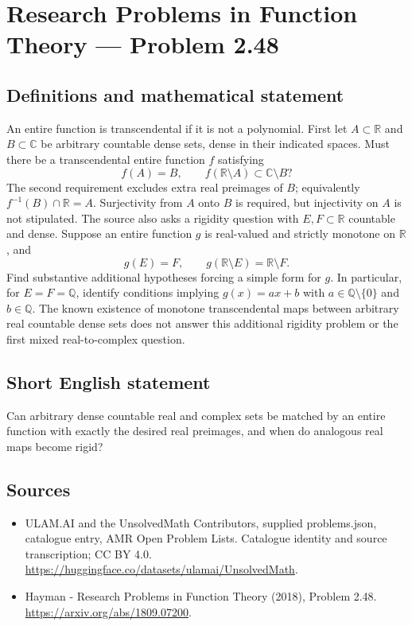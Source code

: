 \documentclass[11pt,a4paper]{article}
\begin{document}
\section*{Research Problems in Function Theory — Problem 2.48}\label{statement}

\subsection{Definitions and mathematical statement}
An entire function is transcendental if it is not a polynomial. First let $A\subset\mathbb R$ and $B\subset\mathbb C$ be arbitrary countable dense sets, dense in their indicated spaces. Must there be a transcendental entire function $f$ satisfying
\[
f(A)=B,\qquad f(\mathbb R\setminus A)\subset\mathbb C\setminus B?
\]
The second requirement excludes extra real preimages of $B$; equivalently $f^{-1}(B)\cap\mathbb R=A$. Surjectivity from $A$ onto $B$ is required, but injectivity on $A$ is not stipulated.
The source also asks a rigidity question with $E,F\subset\mathbb R$ countable and dense. Suppose an entire function $g$ is real-valued and strictly monotone on $\mathbb R$, and
\[
g(E)=F,\qquad g(\mathbb R\setminus E)=\mathbb R\setminus F.
\]
Find substantive additional hypotheses forcing a simple form for $g$. In particular, for $E=F=\mathbb Q$, identify conditions implying $g(x)=ax+b$ with $a\in\mathbb Q\setminus\{0\}$ and $b\in\mathbb Q$. The known existence of monotone transcendental maps between arbitrary real countable dense sets does not answer this additional rigidity problem or the first mixed real-to-complex question.
\subsection{Short English statement}
Can arbitrary dense countable real and complex sets be matched by an entire function with exactly the desired real preimages, and when do analogous real maps become rigid?
\subsection{Sources}
\begin{itemize}
\item[S1] ULAM.AI and the UnsolvedMath Contributors, supplied problems.json, catalogue entry, AMR Open Problem Lists. Catalogue identity and source transcription; CC BY 4.0.
\url{https://huggingface.co/datasets/ulamai/UnsolvedMath}.
\item[S2] Hayman - Research Problems in Function Theory (2018), Problem 2.48. 
\url{https://arxiv.org/abs/1809.07200}.
\end{itemize}
\end{document}

